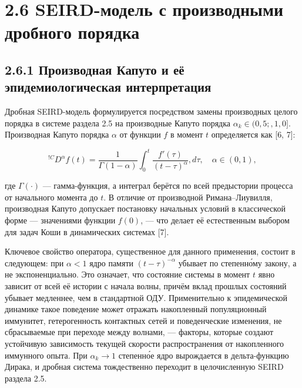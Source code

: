 \documentclass[12pt]{article}
\begin{document}
\section{2.6 SEIRD-модель с производными дробного
порядка}\label{seird-ux43cux43eux434ux435ux43bux44c-ux441-ux43fux440ux43eux438ux437ux432ux43eux434ux43dux44bux43cux438-ux434ux440ux43eux431ux43dux43eux433ux43e-ux43fux43eux440ux44fux434ux43aux430}

\subsection{2.6.1 Производная Капуто и её эпидемиологическая
интерпретация}\label{ux43fux440ux43eux438ux437ux432ux43eux434ux43dux430ux44f-ux43aux430ux43fux443ux442ux43e-ux438-ux435ux451-ux44dux43fux438ux434ux435ux43cux438ux43eux43bux43eux433ux438ux447ux435ux441ux43aux430ux44f-ux438ux43dux442ux435ux440ux43fux440ux435ux442ux430ux446ux438ux44f}

Дробная SEIRD-модель формулируется посредством замены производных целого
порядка в системе раздела 2.5 на производные Капуто порядка
\(\alpha_k \in (0{,}5;, 1{,}0]\). Производная Капуто порядка \(\alpha\)
от функции \(f\) в момент \(t\) определяется как {[}6, 7{]}:

\[{}^{!C}D^\alpha f(t) = \frac{1}{\Gamma(1-\alpha)} \int_0^t \frac{f'(\tau)}{(t - \tau)^{\alpha}}, d\tau, \quad \alpha \in (0, 1),\]

где \(\Gamma(\cdot)\) --- гамма-функция, а интеграл берётся по всей
предыстории процесса от начального момента до \(t\). В отличие от
производной Римана--Лиувилля, производная Капуто допускает постановку
начальных условий в классической форме --- значениями функции \(f(0)\),
--- что делает её естественным выбором для задач Коши в динамических
системах {[}7{]}.

Ключевое свойство оператора, существенное для данного применения,
состоит в следующем: при \(\alpha < 1\) ядро памяти
\((t - \tau)^{-\alpha}\) убывает по степенно́му закону, а не
экспоненциально. Это означает, что состояние системы в момент \(t\) явно
зависит от всей её истории с начала волны, причём вклад прошлых
состояний убывает медленнее, чем в стандартной ОДУ. Применительно к
эпидемической динамике такое поведение может отражать накопленный
популяционный иммунитет, гетерогенность контактных сетей и поведенческие
изменения, не сбрасываемые при переходе между волнами, --- факторы,
которые создают устойчивую зависимость текущей скорости распространения
от накопленного иммунного опыта. При \(\alpha_k \to 1\) степенно́е ядро
вырождается в дельта-функцию Дирака, и дробная система тождественно
переходит в целочисленную SEIRD раздела 2.5.
\end{document}

